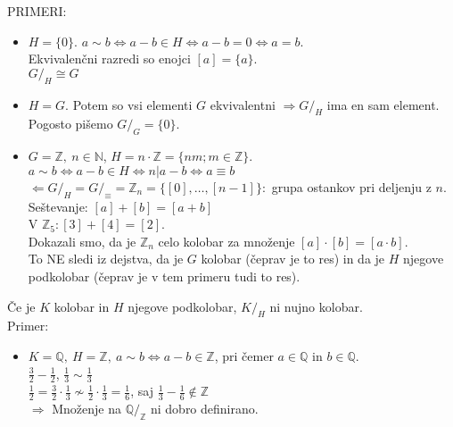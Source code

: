 \documentclass[a4paper,12pt]{article}
\begin{document}
PRIMERI:
\begin{itemize}
\item $H=\{0\}$. $a\sim b \Leftrightarrow a-b\in H \Leftrightarrow a-b=0 \Leftrightarrow a=b$. \\

Ekvivalenčni razredi so enojci $[a]=\{a\}$. \\

$G/_H \cong G$ 

\item $H=G$. Potem so vsi elementi $G$ ekvivalentni $\Rightarrow G/_H$ ima en sam element. Pogosto pišemo $G/_G=\{0\}$. 
\item $G=\mathbb{Z},~n\in \mathbb{N}$, $H=n\cdot \mathbb{Z}=\{nm;m\in \mathbb{Z}\}$. \\

$a\sim b \Leftrightarrow a-b\in H \Leftrightarrow n|a-b \Leftrightarrow a \equiv b$ \\

$\Leftarrow G/_H = G/_\equiv = \mathbb{Z}_n=\{[0],\ldots,[n-1]\}:$ grupa ostankov pri deljenju z $n$. \\

Seštevanje: $[a]+[b]=[a+b]$ \\

V $\mathbb{Z}_5: [3]+[4]=[2]$.\\

Dokazali smo, da je $\mathbb{Z}_n$ celo kolobar za množenje $[a]\cdot [b]=[a\cdot b]$. \\

To NE sledi iz dejstva, da je $G$ kolobar (čeprav je to res) in da je $H$ njegove podkolobar (čeprav je v tem primeru tudi to res).\\ 
\end{itemize}

Če je $K$ kolobar in $H$ njegove podkolobar, $K/_H$ ni nujno kolobar. \\

Primer: 
\begin{itemize}
\item $K=\mathbb{Q},~H=\mathbb{Z},~a\sim b\Leftrightarrow a-b\in \mathbb{Z}$, pri čemer $a\in \mathbb{Q}$ in $b\in \mathbb{Q}$. \\

$\frac{3}{2}-\frac{1}{2}$, $\frac{1}{3} \sim \frac{1}{3}$ \\

$\frac{1}{2}=\frac{3}{2} \cdot \frac{1}{3} \not \sim \frac{1}{2} \cdot \frac{1}{3} = \frac{1}{6}$, saj $\frac{1}{3} - \frac{1}{6} \not \in \mathbb{Z}$ \\

$\Rightarrow$ Množenje na $\mathbb{Q}/_\mathbb{Z}$ ni dobro definirano. \\
\end{itemize}
\end{document}
